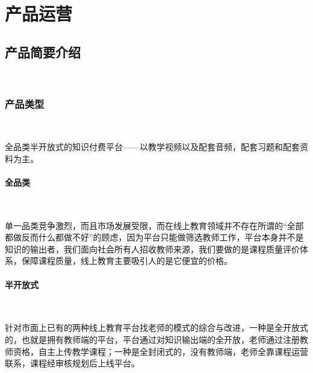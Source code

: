 \section{产品运营}
\subsection{产品简要介绍}\

\subsubsection{产品类型}\

全品类半开放式的知识付费平台——以教学视频以及配套音频，配套习题和配套资料为主。

\paragraph{全品类}\

单一品类竞争激烈，而且市场发展受限，而在线上教育领域并不存在所谓的“全部都做反而什么都做不好”的顾虑，因为平台只能做筛选教师工作，平台本身并不是知识的输出者，我们面向社会所有人招收教师来源，我们要做的是课程质量评价体系，保障课程质量，线上教育主要吸引人的是它便宜的价格。

\paragraph{半开放式}\

针对市面上已有的两种线上教育平台找老师的模式的综合与改进，一种是全开放式的，也就是拥有教师端的平台，平台通过对知识输出端的全开放，老师通过注册教师资格，自主上传教学课程；一种是全封闭式的，没有教师端，老师全靠课程运营联系，课程经审核规划后上线平台。

